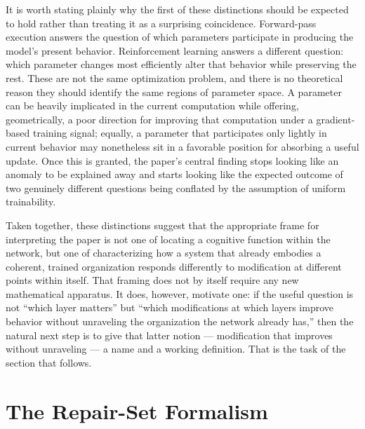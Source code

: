 \documentclass[11pt]{article}
\begin{document}
It is worth stating plainly why the first of these distinctions should be expected to hold rather than treating it as a surprising coincidence. Forward-pass execution answers the question of which parameters participate in producing the model's present behavior. Reinforcement learning answers a different question: which parameter changes most efficiently alter that behavior while preserving the rest. These are not the same optimization problem, and there is no theoretical reason they should identify the same regions of parameter space. A parameter can be heavily implicated in the current computation while offering, geometrically, a poor direction for improving that computation under a gradient-based training signal; equally, a parameter that participates only lightly in current behavior may nonetheless sit in a favorable position for absorbing a useful update. Once this is granted, the paper's central finding stops looking like an anomaly to be explained away and starts looking like the expected outcome of two genuinely different questions being conflated by the assumption of uniform trainability.

Taken together, these distinctions suggest that the appropriate frame for interpreting the paper is not one of locating a cognitive function within the network, but one of characterizing how a system that already embodies a coherent, trained organization responds differently to modification at different points within itself. That framing does not by itself require any new mathematical apparatus. It does, however, motivate one: if the useful question is not ``which layer matters'' but ``which modifications at which layers improve behavior without unraveling the organization the network already has,'' then the natural next step is to give that latter notion --- modification that improves without unraveling --- a name and a working definition. That is the task of the section that follows.

\section{The Repair-Set Formalism}
\end{document}
